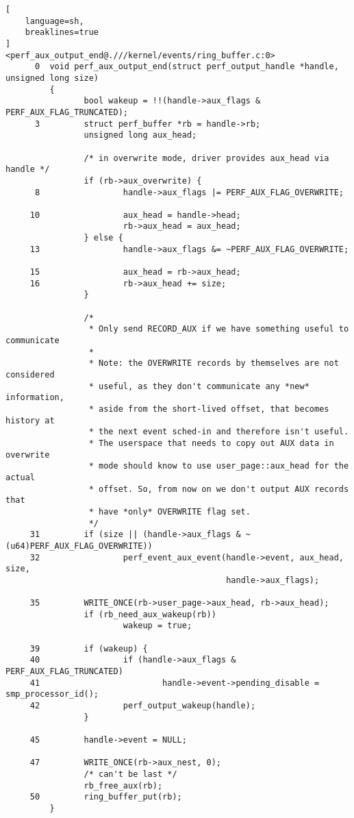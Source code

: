 \documentclass[11pt]{diazessay} %
\begin{document}
\begin{lstlisting}[
  	language=sh,
	breaklines=true
]
<perf_aux_output_end@.///kernel/events/ring_buffer.c:0>
      0  void perf_aux_output_end(struct perf_output_handle *handle, unsigned long size)
         {
                bool wakeup = !!(handle->aux_flags & PERF_AUX_FLAG_TRUNCATED);
      3         struct perf_buffer *rb = handle->rb;
                unsigned long aux_head;

                /* in overwrite mode, driver provides aux_head via handle */
                if (rb->aux_overwrite) {
      8                 handle->aux_flags |= PERF_AUX_FLAG_OVERWRITE;

     10                 aux_head = handle->head;
                        rb->aux_head = aux_head;
                } else {
     13                 handle->aux_flags &= ~PERF_AUX_FLAG_OVERWRITE;

     15                 aux_head = rb->aux_head;
     16                 rb->aux_head += size;
                }

                /*
                 * Only send RECORD_AUX if we have something useful to communicate
                 *
                 * Note: the OVERWRITE records by themselves are not considered
                 * useful, as they don't communicate any *new* information,
                 * aside from the short-lived offset, that becomes history at
                 * the next event sched-in and therefore isn't useful.
                 * The userspace that needs to copy out AUX data in overwrite
                 * mode should know to use user_page::aux_head for the actual
                 * offset. So, from now on we don't output AUX records that
                 * have *only* OVERWRITE flag set.
                 */
     31         if (size || (handle->aux_flags & ~(u64)PERF_AUX_FLAG_OVERWRITE))
     32                 perf_event_aux_event(handle->event, aux_head, size,
                                             handle->aux_flags);

     35         WRITE_ONCE(rb->user_page->aux_head, rb->aux_head);
                if (rb_need_aux_wakeup(rb))
                        wakeup = true;

     39         if (wakeup) {
     40                 if (handle->aux_flags & PERF_AUX_FLAG_TRUNCATED)
     41                         handle->event->pending_disable = smp_processor_id();
     42                 perf_output_wakeup(handle);
                }

     45         handle->event = NULL;

     47         WRITE_ONCE(rb->aux_nest, 0);
                /* can't be last */
                rb_free_aux(rb);
     50         ring_buffer_put(rb);
         }
\end{lstlisting}
\end{document}
